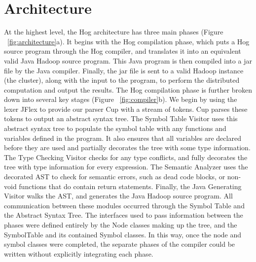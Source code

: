 \documentclass{report}
\begin{document}
\section{Architecture}At the highest level, the Hog architecture has three main phases (Figure ~\ref{fig:architecture}a). It begins with the Hog compilation phase, which puts a Hog source program through the Hog compiler, and translates it into an equivalent valid Java Hadoop source program. This Java program is then compiled into a jar file by the Java compiler. Finally, the jar file is sent to a valid Hadoop instance (the cluster), along with the input to the program, to perform the distributed computation and output the results.
The Hog compilation phase is further broken down into several key stages (Figure ~\ref{fig:compiler}b). We begin by using the lexer JFlex to provide our parser Cup with a stream of tokens. Cup parses these tokens to output an abstract syntax tree. The Symbol Table Visitor uses this abstract syntax tree to populate the symbol table with any functions and variables defined in the program. It also ensures that all variables are declared before they are used and partially decorates the tree with some type information. The Type Checking Visitor checks for any type conflicts, and fully decorates the tree with type information for every expression. The Semantic Analyzer uses the decorated AST to check for semantic errors, such as dead code blocks, or non-void functions that do contain return statements. Finally, the Java Generating Visitor walks the AST, and generates the Java Hadoop source program.
All communication between these modules occurred through the Symbol Table and the Abstract Syntax Tree. The interfaces used to pass information between the phases were defined entirely by the Node classes making up the tree, and the SymbolTable and its contained Symbol classes. In this way, once the node and symbol classes were completed, the separate phases of the compiler could be written without explicitly integrating each phase.
\end{document}
